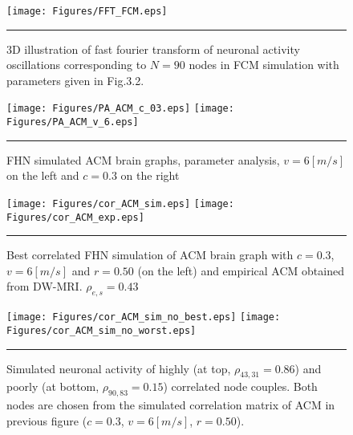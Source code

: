 \begin{figure}[htbp]
 
  \centering
	 \texttt{[image: Figures/FFT\_FCM.eps]} 

    \rule{35em}{0.5pt}
  \caption[3D Fourier Transform, FHN, FCM]{3D illustration of fast fourier transform of neuronal activity oscillations corresponding to $N=90$ nodes in FCM simulation with parameters given in Fig.3.2.} 
    \label{fig:3D Fourier Transform, FHN, FCM}
 	
\end{figure}  
 




\begin{figure}[htbp]
 
  \centering
    \texttt{[image: Figures/PA\_ACM\_c\_03.eps]} 
	\texttt{[image: Figures/PA\_ACM\_v\_6.eps]} 

	
    \rule{35em}{0.5pt}
  \caption[Parameter Analysis, ACM]{FHN simulated ACM brain graphs, parameter analysis, $v=6[m/s]$ on the left and $c=0.3$ on the right }
  \label{fig:Parameter Analysis, ACM}
 	
\end{figure} 





\begin{figure}[htbp]
 
  \centering
	 \texttt{[image: Figures/cor\_ACM\_sim.eps]} 
   	 \texttt{[image: Figures/cor\_ACM\_exp.eps]} 

    \rule{35em}{0.5pt}
  \caption[Best correlated FHN simulation, ACM]{Best correlated FHN simulation of ACM brain graph with $c=0.3$, $v=6 [m/s]$ and $r=0.50$ (on the left) and empirical ACM obtained from DW-MRI. $\rho_{e,s} = 0.43$} 
    \label{fig:Best correlated FHN simulation, ACM}
 	
\end{figure}



\begin{figure}[htbp]
 
  \centering
	 \texttt{[image: Figures/cor\_ACM\_sim\_no\_best.eps]} 
   	 \texttt{[image: Figures/cor\_ACM\_sim\_no\_worst.eps]} 

    \rule{35em}{0.5pt}
  \caption[Neural Activity Node Dynamics, ACM]{Simulated neuronal activity of highly (at top, $\rho_{43,31}=0.86$) and poorly (at bottom, $\rho_{90,83}=0.15$) correlated node couples. Both nodes are chosen from the simulated correlation matrix of ACM in previous figure ($c=0.3$, $v=6 [m/s]$, $r=0.50$).} 
    \label{fig:Neural Activity Node Dynamics, ACM}
 	
\end{figure} 




